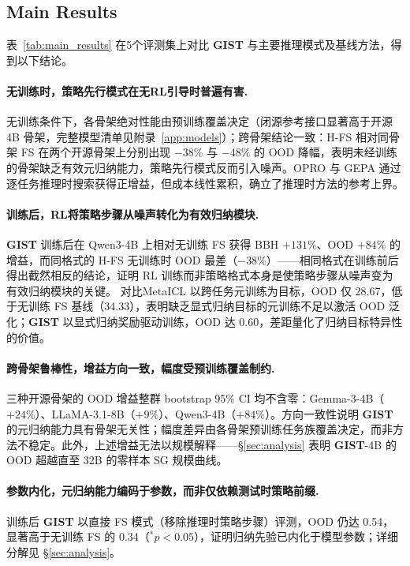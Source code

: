 \documentclass[11pt]{article}
\newcommand{\gist}{\textbf{GIST}}
\begin{document}
\subsection{Main Results}
\label{sec:main_results}

表~\ref{tab:main_results} 在5个评测集上对比 \gist{} 与主要推理模式及基线方法，得到以下结论。

\paragraph{无训练时，策略先行模式在无RL引导时普遍有害.}
无训练条件下，各骨架绝对性能由预训练覆盖决定（闭源参考接口显著高于开源 4B 骨架，完整模型清单见附录~\ref{app:models}）；跨骨架结论一致：H-FS 相对同骨架 FS 在两个开源骨架上分别出现 $-38\%$ 与 $-48\%$ 的 OOD 降幅，表明未经训练的骨架缺乏有效元归纳能力，策略先行模式反而引入噪声。OPRO 与 GEPA 通过逐任务推理时搜索获得正增益，但成本线性累积，确立了推理时方法的参考上界。

\paragraph{训练后，RL将策略步骤从噪声转化为有效归纳模块.}
\gist{} 训练后在 Qwen3-4B 上相对无训练 FS 获得 BBH $+131\%$、OOD $+84\%$ 的增益，而同格式的 H-FS 无训练时 OOD 最差（$-38\%$）——相同格式在训练前后得出截然相反的结论，证明 RL 训练而非策略格式本身是使策略步骤从噪声变为有效归纳模块的关键。
对比MetaICL 以跨任务元训练为目标，OOD 仅 28.67，低于无训练 FS 基线（34.33），表明缺乏显式归纳目标的元训练不足以激活 OOD 泛化；\gist{} 以显式归纳奖励驱动训练，OOD 达 0.60，差距量化了归纳目标特异性的价值。

\paragraph{跨骨架鲁棒性，增益方向一致，幅度受预训练覆盖制约.}
三种开源骨架的 OOD 增益整群 bootstrap 95\% CI 均不含零：Gemma-3-4B（$+24\%$）、LLaMA-3.1-8B（$+9\%$）、Qwen3-4B（$+84\%$）。方向一致性说明 \gist{} 的元归纳能力具有骨架无关性；幅度差异由各骨架预训练任务族覆盖决定，而非方法不稳定。此外，上述增益无法以规模解释——\S\ref{sec:analysis} 表明 \gist{}-4B 的 OOD 超越直至 32B 的零样本 SG 规模曲线。

\paragraph{参数内化，元归纳能力编码于参数，而非仅依赖测试时策略前缀.}
训练后 \gist{} 以直接 FS 模式（移除推理时策略步骤）评测，OOD 仍达 0.54，显著高于无训练 FS 的 0.34（$^{*}p{<}0.05$），证明归纳先验已内化于模型参数；详细分解见 \S\ref{sec:analysis}。
\end{document}
